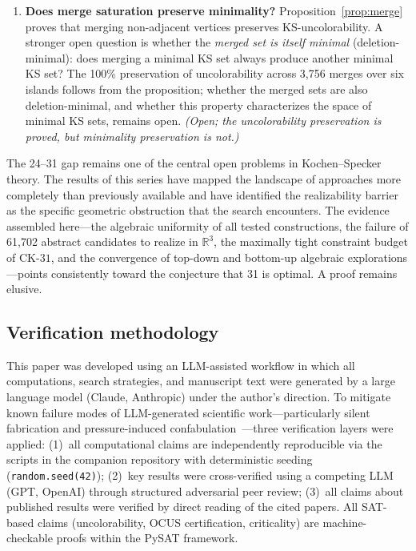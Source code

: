 \documentclass[twocolumn,pra,superscriptaddress,nofootinbib]{revtex4-2}
\newcommand{\R}{\mathbb{R}}
\newcommand{\CK}{\mathrm{CK\text{-}31}}
\begin{document}
\begin{enumerate}
\item \textbf{Does merge saturation preserve minimality?}
Proposition~\ref{prop:merge} proves that merging non-adjacent vertices preserves
KS-uncolorability. A stronger open question is whether the \emph{merged set is
itself minimal} (deletion-minimal): does merging a minimal KS set always produce
another minimal KS set? The 100\% preservation of uncolorability across 3,756
merges over six islands follows from the proposition; whether the merged sets are
also deletion-minimal, and whether this property characterizes the space of
minimal KS sets, remains open. \textit{(Open; the uncolorability preservation
is proved, but minimality preservation is not.)}

\end{enumerate}

The 24--31 gap remains one of the central open problems in Kochen--Specker
theory. The results of this series have mapped the landscape of approaches
more completely than previously available and have identified the realizability
barrier as the specific geometric obstruction that the search encounters.
The evidence assembled here---the algebraic uniformity of all tested
constructions, the failure of 61,702 abstract candidates to realize in $\R^3$,
the maximally tight constraint budget of $\CK$, and the convergence of
top-down and bottom-up algebraic explorations---points consistently toward
the conjecture that 31 is optimal.
A proof remains elusive.

\subsection{Verification methodology}

This paper was developed using an LLM-assisted workflow in which all computations, search strategies, and manuscript text were generated by a large language model (Claude, Anthropic) under the author's direction.  To mitigate known failure modes of LLM-generated scientific work---particularly silent fabrication and pressure-induced confabulation~\cite{Schwartz2026}---three verification layers were applied: (1)~all computational claims are independently reproducible via the scripts in the companion repository with deterministic seeding (\texttt{random.seed(42)}); (2)~key results were cross-verified using a competing LLM (GPT, OpenAI) through structured adversarial peer review; (3)~all claims about published results were verified by direct reading of the cited papers.  All SAT-based claims (uncolorability, OCUS certification, criticality) are machine-checkable proofs within the PySAT framework.
\end{document}

